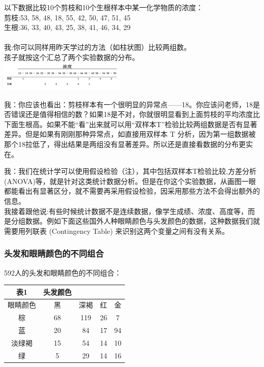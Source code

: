 以下数据比较10个剪枝和10个生根样本中某一化学物质的浓度：\\
剪枝:53, 58, 48, 18, 55, 42, 50, 47, 51, 45\\
生根:36, 33, 40, 43, 25, 38, 41, 46, 34, 29\\
~\\
我:你可以同样用昨天学过的方法（如柱状图）比较两组数。\\
孩子就按这个汇总了两个实验数据的分布。\\

\includegraphics[width=6cm]{图片61-11.png}

我：你应该也看出：剪枝样本有一个很明显的异常点------18。你应该问老师，18是否错误还是值得相信的数？如果18是不对，你就很明显看到上面剪枝的平均浓度比下面生根高。如果不能``看''出来就可以用``双样本T''检验比较两组数据是否有显著差异。但是如果有刚刚那种异常点，如直接用双样本
T
分析，因为第一组数据被那个18拉低了，得出结果是两组没有显著差异。所以还是直接看数据的分布更实在。

我：我们在统计学可以使用假设检验（注），其中包括双样本T检验比较,方差分析(ANOVA)等，就是针对这类统计数据分析。但是在你这个实验数据，从画图一眼都能看出有显著区分，就不需要再采用假设检验，因采用那些方法不会得出额外的信息。\\
我接着跟他说:有些时候统计数据不是连续数据，像学生成绩、浓度、高度等，而是分组数据。例如下面这些国外人种眼睛颜色与头发颜色的数据，这种数据我们就需要用列联表
(Contingency Table) 来识别这两个变量之间有没有关系。\\

\hypertarget{ux5934ux53d1ux548cux773cux775bux989cux8272ux7684ux4e0dux540cux7ec4ux5408}{%
\subsubsection{头发和眼睛颜色的不同组合}\label{ux5934ux53d1ux548cux773cux775bux989cux8272ux7684ux4e0dux540cux7ec4ux5408}}

592人的头发和眼睛颜色的不同组合：


\begin{tabular}{|c|c|c|c|c|}
\hline
表1&\multirow{4}{*}{头发颜色 }\\
\hline
眼睛颜色&黑&深褐&红&金\\
\hline
棕&68&119&26&7\\
\hline
蓝&20&84&17&94\\
\hline
淡绿褐&15&54&14&10\\
\hline
绿&5&29&14&16\\
\hline
\end{tabular}

